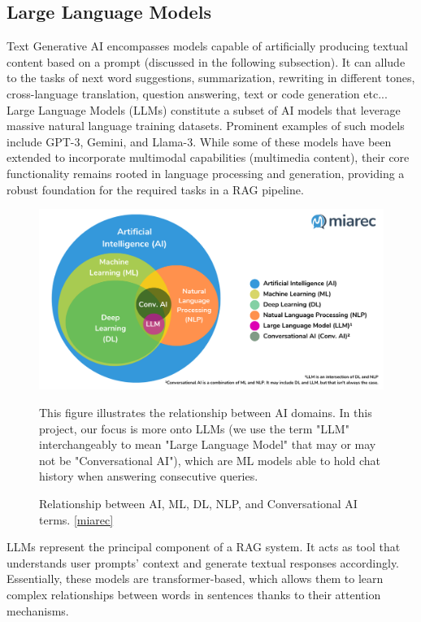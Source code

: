 \subsection{Large Language Models}
Text Generative AI encompasses models capable of artificially producing textual content based on a prompt (discussed in the following subsection). It can allude to the tasks of next word suggestions, summarization, rewriting in different tones, cross-language translation, question answering, text or code generation etc...
Large Language Models (LLMs) constitute a subset of AI models that leverage massive natural language training datasets. Prominent examples of such models include GPT-3, Gemini, and Llama-3. While some of these models have been extended to incorporate multimodal capabilities (multimedia content), their core functionality remains rooted in language processing and generation, providing a robust foundation for the required tasks in a RAG pipeline.
\begin{figure}[H]
    \centering
    \includegraphics[width=.97\linewidth]{./figures/genai-relation-diagram.png}
    \caption{Relationship between AI, ML, DL, NLP, and Conversational AI terms. \href{https://blog.miarec.com/contact-centers-ai-definition}{[miarec]}}
    \begin{flushleft}
        \small This figure illustrates the relationship between AI domains. In this project, our focus is more onto LLMs (we use the term "LLM" interchangeably to mean "Large Language Model" that may or may not be "Conversational AI"), which are ML models able to hold chat history when answering consecutive queries.
    \end{flushleft}
\end{figure}
LLMs represent the principal component of a RAG system. It acts as tool that understands user prompts' context and generate textual responses accordingly. Essentially, these models are transformer-based, which allows them to learn complex relationships between words in sentences thanks to their attention mechanisms.
